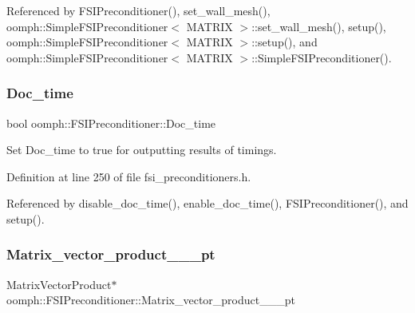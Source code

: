 Referenced by F\+S\+I\+Preconditioner(), set\+\_\+wall\+\_\+mesh(), oomph\+::\+Simple\+F\+S\+I\+Preconditioner$<$ M\+A\+T\+R\+I\+X $>$\+::set\+\_\+wall\+\_\+mesh(), setup(), oomph\+::\+Simple\+F\+S\+I\+Preconditioner$<$ M\+A\+T\+R\+I\+X $>$\+::setup(), and oomph\+::\+Simple\+F\+S\+I\+Preconditioner$<$ M\+A\+T\+R\+I\+X $>$\+::\+Simple\+F\+S\+I\+Preconditioner().

\mbox{\label{classoomph_1_1FSIPreconditioner_a405ccaf05553b1bf7702cb2f25df57e9}} 
\subsubsection{\texorpdfstring{Doc\+\_\+time}{Doc\_time}}
{\footnotesize\ttfamily bool oomph\+::\+F\+S\+I\+Preconditioner\+::\+Doc\+\_\+time\hspace{0.3cm}{\ttfamily [private]}}



Set Doc\+\_\+time to true for outputting results of timings. 



Definition at line 250 of file fsi\+\_\+preconditioners.\+h.



Referenced by disable\+\_\+doc\+\_\+time(), enable\+\_\+doc\+\_\+time(), F\+S\+I\+Preconditioner(), and setup().

\mbox{\label{classoomph_1_1FSIPreconditioner_a595acfea83abd9fd907c208f3b487f57}} 
\subsubsection{\texorpdfstring{Matrix\+\_\+vector\+\_\+product\+\_\+\_\+\_\+pt}{Matrix\_vector\_product\_0\_1\_pt}}
{\footnotesize\ttfamily Matrix\+Vector\+Product$\ast$ oomph\+::\+F\+S\+I\+Preconditioner\+::\+Matrix\+\_\+vector\+\_\+product\+\_\+\_\+\_\+pt\hspace{0.3cm}{\ttfamily [private]}}



